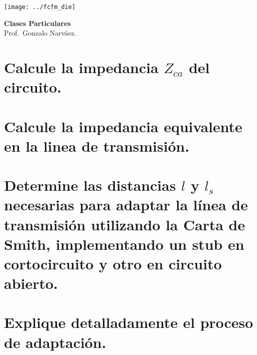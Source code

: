 \documentclass[
  11pt,
  letterpaper,
  answers
]{exam}
\begin{document}
\begin{minipage}{0.42\textwidth}
    \texttt{[image: ../fcfm\_die]}
\end{minipage}
\begin{minipage}{0.53\textwidth}
\begin{center} 
\large\textbf{Clases Particulares} \\
\normalsize Prof.~Gonzalo Narváez.
\end{center}
\end{minipage}

\vspace{0.5cm}
\noindent
\begin{questions}

\begin{parts}
  \part[2]{Calcule la impedancia $Z_{ca}$ del circuito.}
  \part[2]{Calcule la impedancia equivalente en la linea de transmisión.}
  \part[4]{Determine las distancias $l$ y $l_s$ necesarias para adaptar la línea de transmisión utilizando la Carta de Smith, implementando un stub en cortocircuito y otro en circuito abierto.}
  \part[2]{Explique detalladamente el proceso de adaptación.}
\end{parts}

\begin{figure}[ht]
    \centering
\end{figure}
\end{questions}
\end{document}
